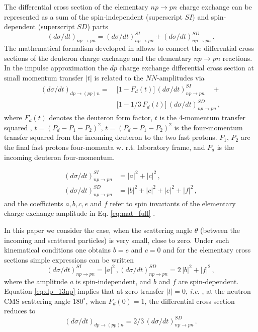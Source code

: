 \documentclass[twocolumn,epjc3]{svjour3}
\newcommand{\np}     {\ensuremath{np \rightarrow pn}\xspace}
\newcommand{\dpchex} {\ensuremath{dp \rightarrow (pp)n}\xspace}
\providecommand{\DIFaddtex}[1]{{\protect\color{Green} \sf #1}} %
\providecommand{\DIFdeltex}[1]{{\protect\color{Red} \scriptsize #1}} %
\providecommand{\DIFaddbegin}{} %
\providecommand{\DIFaddend}{} %
\providecommand{\DIFdelbegin}{} %
\providecommand{\DIFdelend}{} %
\providecommand{\DIFadd}[1]{\texorpdfstring{\DIFaddtex{#1}}{#1}} %
\providecommand{\DIFdel}[1]{\texorpdfstring{\DIFdeltex{#1}}{}} %
\newcommand{\DIFscaledelfig}{0.5}
\newlength{\DIFdelgraphicswidth} %
\newlength{\DIFdelgraphicsheight} %
\newcommand{\DIFaddincludegraphics}[2][]{{\color{blue}\fbox{\DIFOincludegraphics[#1]{#2}}}} %
\newcommand{\DIFdelincludegraphics}[2][]{%
\sbox{\DIFdelgraphicsbox}{\DIFOincludegraphics[#1]{#2}}%
\settoboxwidth{\DIFdelgraphicswidth}{\DIFdelgraphicsbox} %
\settoboxtotalheight{\DIFdelgraphicsheight}{\DIFdelgraphicsbox} %
\scalebox{\DIFscaledelfig}{%
\parbox[b]{\DIFdelgraphicswidth}{\usebox{\DIFdelgraphicsbox}\\[-\baselineskip] \rule{\DIFdelgraphicswidth}{0em}}\llap{\resizebox{\DIFdelgraphicswidth}{\DIFdelgraphicsheight}{%
\setlength{\unitlength}{\DIFdelgraphicswidth}%
\begin{picture}(1,1)%
\thicklines\linethickness{2pt} %
{\color[rgb]{1,0,0}\put(0,0){\framebox(1,1){}}}%
{\color[rgb]{1,0,0}\put(0,0){\line( 1,1){1}}}%
{\color[rgb]{1,0,0}\put(0,1){\line(1,-1){1}}}%
\end{picture}%
}\hspace*{3pt}}} %
} %
\DeclareRobustCommand{\DIFaddbegin}{\DIFOaddbegin \let\includegraphics\DIFaddincludegraphics} %
\DeclareRobustCommand{\DIFaddend}{\DIFOaddend \let\includegraphics\DIFOincludegraphics} %
\DeclareRobustCommand{\DIFdelbegin}{\DIFOdelbegin \let\includegraphics\DIFdelincludegraphics} %
\DeclareRobustCommand{\DIFdelend}{\DIFOaddend \let\includegraphics\DIFOincludegraphics} %
\begin{document}
The differential cross section of the elementary \np charge exchange can be
represented as a sum of the spin-independent (superscript $SI$) and
spin-dependent (superscript $SD$) parts
\begin{equation}
  \label{eq:np_sum}
  (d\sigma/dt)_{\np} = (d\sigma/dt)^{SI}_{\np} + (d\sigma/dt)^{SD}_{\np}\,.
\end{equation}
The mathematical formalism developed in \cite{dea72, dea72_2, bug87} allows to
connect the differential cross sections of the deuteron charge exchange and the
elementary \np reactions. In the impulse approximation the $dp$ charge exchange
differential cross section at small momentum transfer $|t|$ is related to the
$NN$-amplitudes via
\begin{equation}
  \label{eq:dp_13np}
  \begin{split}
    (d\sigma/dt)_{\dpchex} =\ &\bigl[1 - F_d(t)\bigr]\,(d\sigma/dt)^{SI}_{\np}
    \quad + \\
    &\bigl[1 - 1/3\,F_d(t)\bigr]\,(d\sigma/dt)^{SD}_{\np}\,,
  \end{split}
\end{equation}
where $F_d(t)$ denotes the deuteron form factor, \DIFdelbegin \DIFdel{$t$ is
the 4-mo\-mentum
transfer squared , $t = (P_d - P_1 - P_2)^2$, }\DIFdelend \DIFaddbegin \DIFadd{$t = (P_d - P_1 - P_2)^2$ is
the four-momentum transfer squared from the incoming deuteron to the two fast
protons. }\DIFaddend $P_1$, $P_2$ are the final fast protons four-momenta \DIFdelbegin \DIFdel{w.
r.t. laboratory frame,
}\DIFdelend \DIFaddbegin \DIFadd{and $P_d$ is the
incoming deuteron four-momentum.
}

\DIFaddend \begin{equation}
  \begin{split}
    (d\sigma/dt)^{SI}_{\np} &= |a|^2 +|c|^2\,,\\
    (d\sigma/dt)^{SD}_{\np} &= |b|^2 + |c|^2 + |e|^2 + |f|^2\,,
  \end{split}
\end{equation}
and the coefficients $a, b, c, e$ and $f$ refer to spin invariants of the
elementary charge exchange amplitude in Eq. \eqref{eq:mat_full}
\cite{dea72,ala75_2}.

In this paper we consider the case, when the scattering angle \DIFdelbegin \DIFdel{$\theta$ }\DIFdelend \DIFaddbegin \DIFadd{(between the
incoming and scattered particles) }\DIFaddend is very small, close to zero. Under such
kinematical conditions one obtains $b = e$ and $c = 0$ and for the elementary
cross sections simple expressions can be written
\begin{equation}
  (d\sigma/dt)^{SI}_{\np} = |a|^2\,,
  (d\sigma/dt)^{SD}_{\np} = 2\,|b|^2 + |f|^2\,,
\end{equation}
where the amplitude $a$ is spin-independent, and $b$ and $f$ are spin-dependent.
Equation \eqref{eq:dp_13np} implies that at zero transfer $|t| = 0$,
\textit{i.e.}\DIFaddbegin \DIFadd{, }\DIFaddend at the neutron CMS scattering angle $180^\circ$, when
$F_d(0) = 1$, the differential cross section reduces to
\begin{equation}
  \label{eq:dp_23np}
  (d\sigma/dt)_{\dpchex} = 2/3\,(d\sigma/dt)^{SD}_{\np}\,.
\end{equation}
\end{document}
